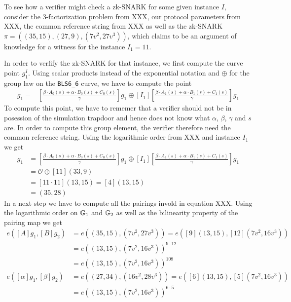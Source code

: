 \begin{example} To see how a verifier might check  
a zk-SNARK for some given instance $I$, consider the $3$-factorization problem from XXX, our protocol parameters from XXX, the common reference string from XXX as well as the zk-SNARK $\pi=((35,15),(27,9),(7v^2,27v^3))$, which claims to be an argument of knowledge for a witness for the instance $I_1=11$.

In order to verfify the zk-SNARK for that instance, we first compute the curve point $g_1^I$. Using scalar products instead of the exponential notation and $\oplus$ for the group law on the \texttt{BLS6\_6} curve, we have to compute the point
\begin{align*}
[I]g_1 = & [\frac{\beta\cdot A_{0}(s)+\alpha\cdot B_{0}(s)+C_{0}(s)}{\gamma}]g_1 \oplus [I_1][\frac{\beta\cdot A_{1}(s)+\alpha\cdot B_{1}(s)+C_{1}(s)}{\gamma}]g_1
\end{align*}
To compute this point, we have to rememer that a verifier should not be in posession of the simulation trapdoor and hence does not know what $\alpha$, $\beta$, $\gamma$ and $s$ are. In order to compute this group element, the verifier therefore need the common reference string. Using the logarithmic order from XXX and instance $I_1$ we get
\begin{align*}
[I]g_1 & = [\frac{\beta\cdot A_{0}(s)+\alpha\cdot B_{0}(s)+C_{0}(s)}{\gamma}]g_1 \oplus [I_1][\frac{\beta\cdot A_{1}(s)+\alpha\cdot B_{1}(s)+C_{1}(s)}{\gamma}]g_1\\
       & = \mathcal{O} \oplus [11](33,9)\\
       & = [11\cdot 11](13,15) = [4](13,15)\\
       & = (35,28)
\end{align*} 
In a next step we have to compute all the pairings invold in equation XXX. Using the logarithmic order on $\mathbb{G}_1$ and $\mathbb{G}_2$ as well as the bilinearity property of the pairing map we get
\begin{align*}
e([A]g_1,[B]g_2) & = e((35,15),(7v^2,27v^3))
                   = e([9](13,15),[12](7v^2,16v^3))\\
               & = e((13,15),(7v^2,16v^3))^{9\cdot 12}\\
               & = e((13,15),(7v^2,16v^3))^{108}\\
e([\alpha]g_1,[\beta]g_2) & = e((27,34),(16v^2,28v^3)) 
                            = e([6](13,15),[5](7v^2,16v^3))\\
               & = e((13,15),(7v^2,16v^3))^{6\cdot 5}\\

\end{align*}
\end{example}
